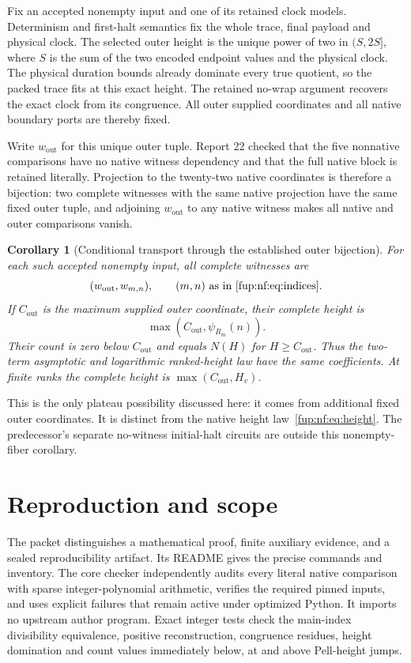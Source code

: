 \documentclass[11pt,letterpaper]{article}
\newtheorem{corollary}[theorem]{Corollary}
\theoremstyle{definition}\newtheorem{definition}[theorem]{Definition}
\theoremstyle{remark}\newtheorem{remark}[theorem]{Remark}
\begin{document}
Fix an accepted nonempty input and one of its retained clock models. Determinism and first-halt semantics fix the whole trace, final payload and physical clock. The selected outer height is the unique power of two in $(S,2S]$, where $S$ is the sum of the two encoded endpoint values and the physical clock. The physical duration bounds already dominate every true quotient, so the packed trace fits at this exact height. The retained no-wrap argument recovers the exact clock from its congruence. All outer supplied coordinates and all native boundary ports are thereby fixed.

Write $w_{\mathrm{out}}$ for this unique outer tuple. Report 22 checked that the five nonnative comparisons have no native witness dependency and that the full native block is retained literally. Projection to the twenty-two native coordinates is therefore a bijection: two complete witnesses with the same native projection have the same fixed outer tuple, and adjoining $w_{\mathrm{out}}$ to any native witness makes all native and outer comparisons vanish.

\begin{corollary}[Conditional transport through the established outer bijection]
For each such accepted nonempty input, all complete witnesses are
\[
 (w_{\mathrm{out}},w_{m,n}),\qquad (m,n)\text{ as in~\eqref{fup:nf:eq:indices}}.
\]
If $C_{\mathrm{out}}$ is the maximum supplied outer coordinate, their complete height is
\[
 \max(C_{\mathrm{out}},\psi_{R_m}(n)).
\]
Their count is zero below $C_{\mathrm{out}}$ and equals $N(H)$ for $H\ge C_{\mathrm{out}}$. Thus the two-term asymptotic and logarithmic ranked-height law have the same coefficients. At finite ranks the complete height is $\max(C_{\mathrm{out}},H_v)$.
\end{corollary}
This is the only plateau possibility discussed here: it comes from additional fixed outer coordinates. It is distinct from the native height law~\eqref{fup:nf:eq:height}. The predecessor's separate no-witness initial-halt circuits are outside this nonempty-fiber corollary.

\section{Reproduction and scope}\label{fup:nf:sec:reproduction}
The packet distinguishes a mathematical proof, finite auxiliary evidence, and a sealed reproducibility artifact. Its README gives the precise commands and inventory. The core checker independently audits every literal native comparison with sparse integer-polynomial arithmetic, verifies the required pinned inputs, and uses explicit failures that remain active under optimized Python. It imports no upstream author program. Exact integer tests check the main-index divisibility equivalence, positive reconstruction, congruence residues, height domination and count values immediately below, at and above Pell-height jumps.
\end{document}
